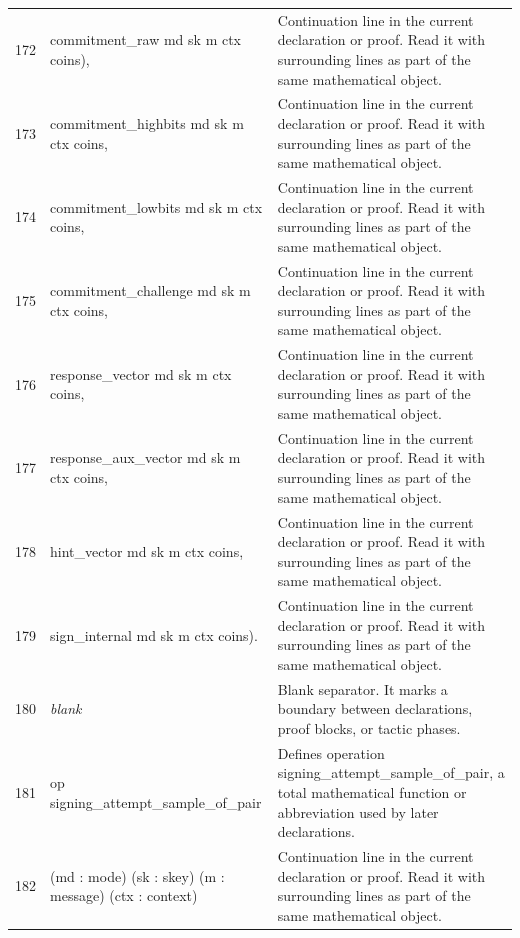 \documentclass[10pt]{article}
\begin{document}
\begin{longtable}{r L{0.53\textwidth} L{0.37\textwidth}}
172 & {\ttfamily\scriptsize       commitment\_raw md sk m ctx coins),} & Continuation line in the current declaration or proof.  Read it with surrounding lines as part of the same mathematical object. \\
173 & {\ttfamily\scriptsize     commitment\_highbits md sk m ctx coins,} & Continuation line in the current declaration or proof.  Read it with surrounding lines as part of the same mathematical object. \\
174 & {\ttfamily\scriptsize     commitment\_lowbits md sk m ctx coins,} & Continuation line in the current declaration or proof.  Read it with surrounding lines as part of the same mathematical object. \\
175 & {\ttfamily\scriptsize     commitment\_challenge md sk m ctx coins,} & Continuation line in the current declaration or proof.  Read it with surrounding lines as part of the same mathematical object. \\
176 & {\ttfamily\scriptsize     response\_vector md sk m ctx coins,} & Continuation line in the current declaration or proof.  Read it with surrounding lines as part of the same mathematical object. \\
177 & {\ttfamily\scriptsize     response\_aux\_vector md sk m ctx coins,} & Continuation line in the current declaration or proof.  Read it with surrounding lines as part of the same mathematical object. \\
178 & {\ttfamily\scriptsize     hint\_vector md sk m ctx coins,} & Continuation line in the current declaration or proof.  Read it with surrounding lines as part of the same mathematical object. \\
179 & {\ttfamily\scriptsize     sign\_internal md sk m ctx coins).} & Continuation line in the current declaration or proof.  Read it with surrounding lines as part of the same mathematical object. \\
180 & {\ttfamily\scriptsize \emph{blank}} & Blank separator.  It marks a boundary between declarations, proof blocks, or tactic phases. \\
181 & {\ttfamily\scriptsize op signing\_attempt\_sample\_of\_pair} & Defines operation signing\_attempt\_sample\_of\_pair, a total mathematical function or abbreviation used by later declarations. \\
182 & {\ttfamily\scriptsize    (md : mode) (sk : skey) (m : message) (ctx : context)} & Continuation line in the current declaration or proof.  Read it with surrounding lines as part of the same mathematical object. \\

\end{longtable}
\end{document}
